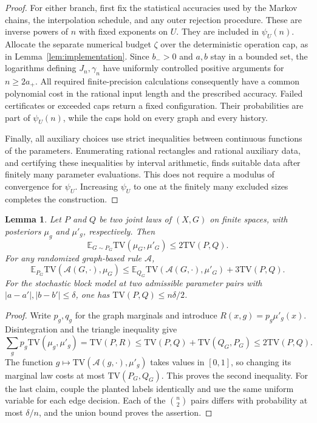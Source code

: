 \documentclass[11pt]{article}
\newcommand{\TV}{\mathrm{TV}}
\def\E{\mathbb{E}}
\newtheorem{lemma}[thm]{Lemma}
\numberwithin{equation}{section}
\begin{document}
\begin{proof}
For either branch, first fix the statistical accuracies used by the Markov chains, the interpolation schedule, and any outer rejection procedure. These are inverse powers of $n$ with fixed exponents on $U$. They are included in $\psi_U(n)$. Allocate the separate numerical budget $\zeta$ over the deterministic operation cap, as in Lemma~\ref{lem:implementation}. Since $b_->0$ and $a,b$ stay in a bounded set, the logarithms defining $J_n,\gamma_n$ have uniformly controlled positive arguments for $n\ge2a_+$. All required finite-precision calculations consequently have a common polynomial cost in the rational input length and the prescribed accuracy. Failed certificates or exceeded caps return a fixed configuration. Their probabilities are part of $\psi_U(n)$, while the caps hold on every graph and every history.

Finally, all auxiliary choices use strict inequalities between continuous functions of the parameters. Enumerating rational rectangles and rational auxiliary data, and certifying these inequalities by interval arithmetic, finds suitable data after finitely many parameter evaluations. This does not require a modulus of convergence for $\psi_U$. Increasing $\psi_U$ to one at the finitely many excluded sizes completes the construction.
\end{proof}

\begin{lemma}\label{pr:stability}
Let $P$ and $Q$ be two joint laws of $(X,G)$ on finite spaces, with posteriors $\mu_g$ and $\mu'_g$, respectively. Then
\[
 \E_{G\sim P_G}\TV(\mu_G,\mu'_G)\le2\TV(P,Q).
\]
For any randomized graph-based rule $\mathcal A$,
\[
 \E_{P_G}\TV(\mathcal A(G,\cdot),\mu_G)
 \le\E_{Q_G}\TV(\mathcal A(G,\cdot),\mu'_G)+3\TV(P,Q).
\]
For the stochastic block model at two admissible parameter pairs with
$|a-a'|,|b-b'|\le\delta$, one has $\TV(P,Q)\le n\delta/2$.
\end{lemma}

\begin{proof}
Write $p_g,q_g$ for the graph marginals and introduce $R(x,g)=p_g\mu'_g(x)$. Disintegration and the triangle inequality give
\[
 \sum_g p_g\TV(\mu_g,\mu'_g)
 =\TV(P,R)\le\TV(P,Q)+\TV(Q_G,P_G)\le2\TV(P,Q).
\]
The function $g\mapsto\TV(\mathcal A(g,\cdot),\mu'_g)$ takes values in $[0,1]$, so changing its marginal law costs at most $\TV(P_G,Q_G)$. This proves the second inequality. For the last claim, couple the planted labels identically and use the same uniform variable for each edge decision. Each of the $\binom n2$ pairs differs with probability at most $\delta/n$, and the union bound proves the assertion.
\end{proof}
\end{document}
